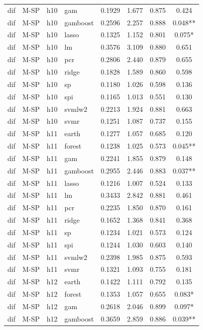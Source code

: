 \begin{ThreePartTable}
\begin{longtable}[t]{llclcccc}
dif & M-SP & h10 & gam & 0.1929 & 1.677 & 0.875 & 0.424\\
dif & M-SP & h10 & gamboost & 0.2596 & 2.257 & 0.888 & 0.048**\\
dif & M-SP & h10 & lasso & 0.1325 & 1.152 & 0.801 & 0.075*\\
dif & M-SP & h10 & lm & 0.3576 & 3.109 & 0.880 & 0.651\\
dif & M-SP & h10 & pcr & 0.2806 & 2.440 & 0.879 & 0.655\\
dif & M-SP & h10 & ridge & 0.1828 & 1.589 & 0.860 & 0.598\\
dif & M-SP & h10 & sp & 0.1180 & 1.026 & 0.598 & 0.136\\
dif & M-SP & h10 & spi & 0.1165 & 1.013 & 0.551 & 0.130\\
dif & M-SP & h10 & svmlw2 & 0.2213 & 1.924 & 0.881 & 0.663\\
dif & M-SP & h10 & svmr & 0.1251 & 1.087 & 0.737 & 0.155\\
\addlinespace
dif & M-SP & h11 & earth & 0.1277 & 1.057 & 0.685 & 0.120\\
dif & M-SP & h11 & forest & 0.1238 & 1.025 & 0.573 & 0.045**\\
dif & M-SP & h11 & gam & 0.2241 & 1.855 & 0.879 & 0.148\\
dif & M-SP & h11 & gamboost & 0.2955 & 2.446 & 0.883 & 0.037**\\
dif & M-SP & h11 & lasso & 0.1216 & 1.007 & 0.524 & 0.133\\
dif & M-SP & h11 & lm & 0.3433 & 2.842 & 0.881 & 0.461\\
dif & M-SP & h11 & pcr & 0.2235 & 1.850 & 0.870 & 0.161\\
dif & M-SP & h11 & ridge & 0.1652 & 1.368 & 0.841 & 0.368\\
dif & M-SP & h11 & sp & 0.1234 & 1.021 & 0.573 & 0.124\\
dif & M-SP & h11 & spi & 0.1244 & 1.030 & 0.603 & 0.140\\
dif & M-SP & h11 & svmlw2 & 0.2398 & 1.985 & 0.875 & 0.593\\
dif & M-SP & h11 & svmr & 0.1321 & 1.093 & 0.755 & 0.181\\
\addlinespace
dif & M-SP & h12 & earth & 0.1422 & 1.111 & 0.792 & 0.135\\
dif & M-SP & h12 & forest & 0.1353 & 1.057 & 0.655 & 0.083*\\
dif & M-SP & h12 & gam & 0.2618 & 2.046 & 0.899 & 0.097*\\
dif & M-SP & h12 & gamboost & 0.3659 & 2.859 & 0.886 & 0.039**\\

\end{longtable}
\end{ThreePartTable}
